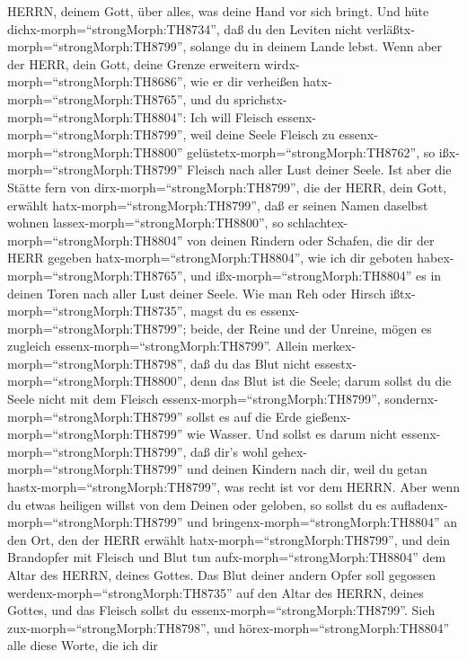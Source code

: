 HERRN, deinem Gott, über alles, was deine Hand vor sich bringt.
 Und hüte dichx-morph=``strongMorph:TH8734'', daß du den
Leviten nicht verläßtx-morph=``strongMorph:TH8799'', solange du in
deinem Lande lebst.  Wenn aber der HERR, dein Gott, deine
Grenze erweitern wirdx-morph=``strongMorph:TH8686'', wie er dir
verheißen hatx-morph=``strongMorph:TH8765'', und du
sprichstx-morph=``strongMorph:TH8804'': Ich will Fleisch
essenx-morph=``strongMorph:TH8799'', weil deine Seele Fleisch zu
essenx-morph=``strongMorph:TH8800''
gelüstetx-morph=``strongMorph:TH8762'', so
ißx-morph=``strongMorph:TH8799'' Fleisch nach aller Lust deiner Seele.
 Ist aber die Stätte fern von
dirx-morph=``strongMorph:TH8799'', die der HERR, dein Gott, erwählt
hatx-morph=``strongMorph:TH8799'', daß er seinen Namen daselbst wohnen
lassex-morph=``strongMorph:TH8800'', so
schlachtex-morph=``strongMorph:TH8804'' von deinen Rindern oder Schafen,
die dir der HERR gegeben hatx-morph=``strongMorph:TH8804'', wie ich dir
geboten habex-morph=``strongMorph:TH8765'', und
ißx-morph=``strongMorph:TH8804'' es in deinen Toren nach aller Lust
deiner Seele.  Wie man Reh oder Hirsch
ißtx-morph=``strongMorph:TH8735'', magst du es
essenx-morph=``strongMorph:TH8799''; beide, der Reine und der Unreine,
mögen es zugleich essenx-morph=``strongMorph:TH8799''. 
Allein merkex-morph=``strongMorph:TH8798'', daß du das Blut nicht
essestx-morph=``strongMorph:TH8800'', denn das Blut ist die Seele; darum
sollst du die Seele nicht mit dem Fleisch
essenx-morph=``strongMorph:TH8799'', 
sondernx-morph=``strongMorph:TH8799'' sollst es auf die Erde
gießenx-morph=``strongMorph:TH8799'' wie Wasser.  Und
sollst es darum nicht essenx-morph=``strongMorph:TH8799'', daß dir's
wohl gehex-morph=``strongMorph:TH8799'' und deinen Kindern nach dir,
weil du getan hastx-morph=``strongMorph:TH8799'', was recht ist vor dem
HERRN.  Aber wenn du etwas heiligen willst von dem Deinen
oder geloben, so sollst du es aufladenx-morph=``strongMorph:TH8799'' und
bringenx-morph=``strongMorph:TH8804'' an den Ort, den der HERR erwählt
hatx-morph=``strongMorph:TH8799'',  und dein Brandopfer mit
Fleisch und Blut tun aufx-morph=``strongMorph:TH8804'' dem Altar des
HERRN, deines Gottes. Das Blut deiner andern Opfer soll gegossen
werdenx-morph=``strongMorph:TH8735'' auf den Altar des HERRN, deines
Gottes, und das Fleisch sollst du essenx-morph=``strongMorph:TH8799''.
 Sieh zux-morph=``strongMorph:TH8798'', und
hörex-morph=``strongMorph:TH8804'' alle diese Worte, die ich dir
